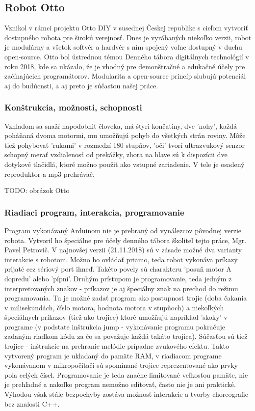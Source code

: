 \subsection{Robot Otto}
Vznikol v rámci projektu Otto DIY v susednej Českej republike s cieľom vytvoriť dostupného robota pre širokú verejnosť. Dnes je vyrábaných niekoľko verzii, robot je modulárny a všetok softvér a hardvér s ním spojený voľne dostupný v duchu open-source. \cite{OttoDIY} Otto bol ústrednou témou Denného tábora digitálnych technológií v roku 2018, kde sa ukázalo, že je vhodný pre demonštračné a edukačné účely pre začínajúcich programátorov. Modularita a open-source princíp sľubujú potenciál aj do budúcnsti, a aj preto je súčasťou našej práce.

\subsubsection{Konštrukcia, možnosti, schopnosti}
Vzhľadom sa snaží napodobniť človeka, má štyri končatiny, dve 'nohy', každá poháňaná dvoma motormi, mu umožňujú pohyb do všetkých strán roviny. Môže tiež pohybovať 'rukami' v rozmedzí 180 stupňov, 'oči' tvorí ultrazvukový senzor schopný merať vzdialenosť od prekážky, zhora na hlave sú k dispozícii dve dotykové tlačidlá, ktoré možno použiť ako vstupné zariadenie. V tele je osadený reproduktor a mp3 prehrávač.

TODO: obrázok Otto

\subsubsection{Riadiaci program, interakcia, programovanie}
Program vykonávaný Arduinom nie je prebraný od vynálezcov pôvodnej verzie robota. Vytvoril ho špeciálne pre účely denného tábora školiteľ tejto práce, Mgr. Pavel Petrovič. V najnovšej verzii (21.11.2018) sú v zásade možné dva varianty interakcie s robotom. Možno ho ovládať priamo, teda robot vykonáva príkazy prijaté cez sériový port ihneď. Takéto povely sú charakteru 'posuň motor A dopredu' alebo 'pípni'. Druhým prístupom je programovanie, teda jedným z interpretovaných znakov - príkazov je aj špeciálny znak na prechod do režimu programovania. Tu je možné zadať program ako postupnosť trojíc (doba čakania v milisekundách, číslo motora, hodnota motora v stupňoch) a niekoľkých špeciálnych príkazov (tiež ako trojice) ktoré umožňujú napríklad 'skoky' v programe (v podstate inštrukcia jump - vykonávanie programu pokračuje zadaným riadkom kódu za čo sa považuje každá takáto trojica). Súčasťou sú tiež trojice - inštrukcie na prehranie melódie prípadne zvukového efektu. Takto vytvorený program je ukladaný do pamäte RAM, v riadiacom programe vykonávanom v mikropočítači sú spomínané trojice reprezentované ako prvky poľa celých čísel. Programovanie je teda značne limitované veľkosťou pamäte, nie je prehľadné a nakoľko program nemožno editovať, často nie je ani praktické. Výhodou však stále bezpochyby zostáva možnosť interakcie a tvorby choreografie bez znalosti C++.


